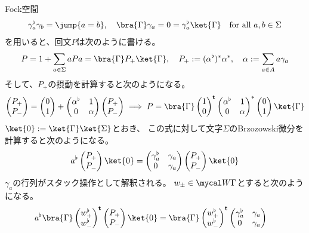 {	Fock空間
	\begin{equation*}\begin{split}
		\gamma_a^\flat\gamma_b=\jump{a=b}
		,\quad \bra{\Gamma}\gamma_a = 0 = \gamma_a^\flat\ket{\Gamma}
		\quad\text{for all } a,b\in\Sigma
	\end{split}\end{equation*}
	を用いると、回文$P$は次のように書ける。
	\begin{equation*}\begin{split}
		P = 1 + \sum_{a\in\Sigma} aPa = \bra{\Gamma}P_+\ket{\Gamma},\quad
		P_+ := (\alpha^\flat)^*\alpha^*,\quad
		\alpha := \sum_{a\in A}a\gamma_a
	\end{split}\end{equation*}
	そして、$P_+$の摂動を計算すると次のようになる。
	\begin{equation*}\begin{split}
		\pvec{P_+}{P_-} = \pvec{0}{1} + \begin{pmatrix}
			\alpha^\flat & 1 \\ 0 & \alpha
		\end{pmatrix}\pvec{P_+}{P_-}
		\implies P = \bra{\Gamma}\pvec{1}{0}^\tran\begin{pmatrix}
			\alpha^\flat & 1 \\ 0 & \alpha \\
		\end{pmatrix}^*\pvec{0}{1}\ket{\Gamma}
	\end{split}\end{equation*}
	$\ket{0}:=\ket{\Gamma}\ket{\Sigma}$とおき、
	この式に対して文字$\Sigma$のBrzozowski微分を計算すると次のようになる。
	\begin{equation*}\begin{split}
		a^\flat\pvec{P_+}{P_-}\ket{0} = \begin{pmatrix}
			\gamma_a^\flat & \gamma_a \\ 0 & \gamma_a
		\end{pmatrix}\pvec{P_+}{P_-}\ket{0}
	\end{split}\end{equation*}
	$\gamma_a$の行列がスタック操作として解釈される。
	$w_\pm\in\W\Gamma$とすると次のようになる。
	\begin{equation*}\begin{split}
		a^\flat\bra{\Gamma}\pvec{w_+^\flat}{w_-^\flat}^\tran
		\pvec{P_+}{P_-}\ket{0} 
		&= \bra{\Gamma}\pvec{w_+^\flat}{w_-^\flat}^\tran\begin{pmatrix}
			\gamma_a^\flat & \gamma_a \\ 0 & \gamma_a

\end{pmatrix}
\end{split}
\end{equation*}}

